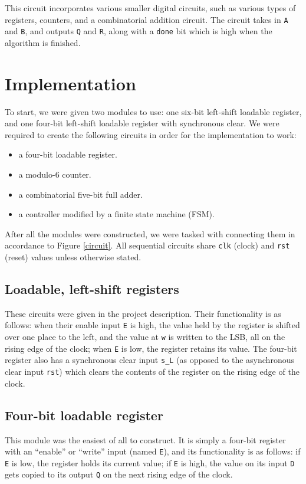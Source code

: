 \documentclass{article}
\renewcommand{\c}[1]{\texttt{#1}}
\begin{document}
This circuit incorporates various smaller digital circuits,
such as various types of registers, counters, and a
combinatorial addition circuit. The circuit takes in
\c{A} and \c{B}, and outputs \c{Q} and \c{R}, along with a
\c{done} bit which is high when the algorithm is finished.

\section{Implementation} To start, we were given two modules to
use: one six-bit left-shift loadable register, and one
four-bit left-shift loadable register with synchronous clear.
We were required to create the following circuits
in order for the implementation to work:
\begin{itemize}
    \item a four-bit loadable register.
    \item a modulo-6 counter.
    \item a combinatorial five-bit full adder.
    \item a controller modified by a finite state machine (FSM).
\end{itemize}

After all the modules were constructed, we were tasked with
connecting them in accordance to Figure \ref{circuit}.
All sequential circuits share
\c{clk} (clock) and \c{rst} (reset) values
unless otherwise stated.

\subsection{Loadable, left-shift registers} These circuits
were given in the project description. Their functionality
is as follows: when their enable input \c{E} is high,
the value held by the register is shifted over one
place to the left, and the value at \c{w} is written
to the LSB, all on the rising edge of the clock;
when \c{E} is low, the register retains its value. The
four-bit register also has a synchronous clear input \c{s\_L}
(as opposed to the asynchronous clear input \c{rst}) which
clears the contents of the register on the rising edge
of the clock.

\subsection{Four-bit loadable register} This module was the
easiest of all to construct. It is simply a four-bit register
with an ``enable'' or ``write'' input (named \c{E}), and its
functionality is as follows: if \c{E} is low, the register
holds its current value; if \c{E} is high, the value on
its input \c{D} gets copied to its output \c{Q} on the next
rising edge of the clock.
\end{document}
